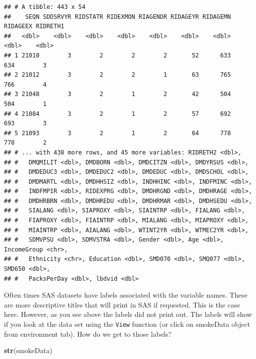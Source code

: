 \documentclass[
]{book}
\newenvironment{Shaded}{\begin{snugshade}}{\end{snugshade}}
\newcommand{\KeywordTok}[1]{\textcolor[rgb]{0.13,0.29,0.53}{\textbf{#1}}}
\newcommand{\NormalTok}[1]{#1}
\theoremstyle{definition}
\theoremstyle{definition}
\theoremstyle{definition}
\theoremstyle{remark}
\begin{document}
\begin{verbatim}
## # A tibble: 443 x 54
##    SEQN SDDSRVYR RIDSTATR RIDEXMON RIAGENDR RIDAGEYR RIDAGEMN RIDAGEEX RIDRETH1
##   <dbl>    <dbl>    <dbl>    <dbl>    <dbl>    <dbl>    <dbl>    <dbl>    <dbl>
## 1 21010        3        2        2        2       52      633      634        3
## 2 21012        3        2        2        1       63      765      766        4
## 3 21048        3        2        1        2       42      504      504        1
## 4 21084        3        2        1        2       57      692      693        3
## 5 21093        3        2        1        2       64      778      778        2
## # ... with 438 more rows, and 45 more variables: RIDRETH2 <dbl>,
## #   DMQMILIT <dbl>, DMDBORN <dbl>, DMDCITZN <dbl>, DMDYRSUS <dbl>,
## #   DMDEDUC3 <dbl>, DMDEDUC2 <dbl>, DMDEDUC <dbl>, DMDSCHOL <dbl>,
## #   DMDMARTL <dbl>, DMDHHSIZ <dbl>, INDHHINC <dbl>, INDFMINC <dbl>,
## #   INDFMPIR <dbl>, RIDEXPRG <dbl>, DMDHRGND <dbl>, DMDHRAGE <dbl>,
## #   DMDHRBRN <dbl>, DMDHREDU <dbl>, DMDHRMAR <dbl>, DMDHSEDU <dbl>,
## #   SIALANG <dbl>, SIAPROXY <dbl>, SIAINTRP <dbl>, FIALANG <dbl>,
## #   FIAPROXY <dbl>, FIAINTRP <dbl>, MIALANG <dbl>, MIAPROXY <dbl>,
## #   MIAINTRP <dbl>, AIALANG <dbl>, WTINT2YR <dbl>, WTMEC2YR <dbl>,
## #   SDMVPSU <dbl>, SDMVSTRA <dbl>, Gender <dbl>, Age <dbl>, IncomeGroup <chr>,
## #   Ethnicity <chr>, Education <dbl>, SMD070 <dbl>, SMQ077 <dbl>, SMD650 <dbl>,
## #   PacksPerDay <dbl>, lbdvid <dbl>
\end{verbatim}

Often times SAS datasets have labels associated with the variable names. These are more descriptive titles that will print in SAS if requested. This is the case here. However, as you see above the labels did not print out. The labels will show if you look at the data set using the \texttt{View} function (or click on smokeData object from environment tab). How do we get to those labels?

\begin{Shaded}
\begin{Highlighting}[]
\KeywordTok{str}\NormalTok{(smokeData)}
\end{Highlighting}
\end{Shaded}
\end{document}
